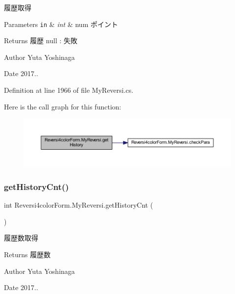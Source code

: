 履歴取得 


\begin{DoxyParams}[1]{Parameters}
\mbox{\tt in}  & {\em int} & num ポイント \\
\hline
\end{DoxyParams}
\begin{DoxyReturn}{Returns}
履歴 null \+: 失敗 
\end{DoxyReturn}
\begin{DoxyAuthor}{Author}
Yuta Yoshinaga 
\end{DoxyAuthor}
\begin{DoxyDate}{Date}
2017.. 
\end{DoxyDate}


Definition at line 1966 of file My\+Reversi.\+cs.

Here is the call graph for this function\+:\nopagebreak
\begin{figure}[H]
\begin{center}
\leavevmode
\includegraphics[width=350pt]{class_reversi4color_form_1_1_my_reversi_a6765e90e98f20c7a19a941400446d006_cgraph}
\end{center}
\end{figure}
\mbox{\label{class_reversi4color_form_1_1_my_reversi_a9d4345e1a06f0d94f073f82037aa6113}} 
\subsubsection{\texorpdfstring{get\+History\+Cnt()}{getHistoryCnt()}}
{\footnotesize\ttfamily int Reversi4color\+Form.\+My\+Reversi.\+get\+History\+Cnt (\begin{DoxyParamCaption}{ }\end{DoxyParamCaption})}



履歴数取得 

\begin{DoxyReturn}{Returns}
履歴数 
\end{DoxyReturn}
\begin{DoxyAuthor}{Author}
Yuta Yoshinaga 
\end{DoxyAuthor}
\begin{DoxyDate}{Date}
2017.. 
\end{DoxyDate}


